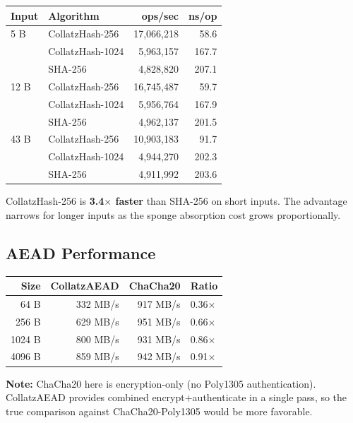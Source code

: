 \documentclass[11pt,a4paper]{article}
\newcommand{\toprule}{\hline}
\newcommand{\midrule}{\hline}
\newcommand{\bottomrule}{\hline}
\begin{document}
\begin{center}
\begin{tabular}{|l|l|r|r|}
\toprule
\textbf{Input} & \textbf{Algorithm} & \textbf{ops/sec} & \textbf{ns/op} \\
\midrule
5 B  & CollatzHash-256  & 17,066,218 & 58.6 \\
     & CollatzHash-1024 & 5,963,157  & 167.7 \\
     & SHA-256          & 4,828,820  & 207.1 \\
\midrule
12 B & CollatzHash-256  & 16,745,487 & 59.7 \\
     & CollatzHash-1024 & 5,956,764  & 167.9 \\
     & SHA-256          & 4,962,137  & 201.5 \\
\midrule
43 B & CollatzHash-256  & 10,903,183 & 91.7 \\
     & CollatzHash-1024 & 4,944,270  & 202.3 \\
     & SHA-256          & 4,911,992  & 203.6 \\
\bottomrule
\end{tabular}
\end{center}

CollatzHash-256 is \textbf{3.4$\times$ faster} than SHA-256 on short
inputs. The advantage narrows for longer inputs as the sponge
absorption cost grows proportionally.

\subsection{AEAD Performance}

\begin{center}
\begin{tabular}{|r|r|r|l|}
\toprule
\textbf{Size} & \textbf{CollatzAEAD} & \textbf{ChaCha20} & \textbf{Ratio} \\
\midrule
64 B   & 332 MB/s   & 917 MB/s  & 0.36$\times$ \\
256 B  & 629 MB/s   & 951 MB/s  & 0.66$\times$ \\
1024 B & 800 MB/s   & 931 MB/s  & 0.86$\times$ \\
4096 B & 859 MB/s   & 942 MB/s  & 0.91$\times$ \\
\bottomrule
\end{tabular}
\end{center}

\textbf{Note:} ChaCha20 here is encryption-only (no Poly1305
authentication). CollatzAEAD provides combined encrypt+authenticate in a
single pass, so the true comparison against ChaCha20-Poly1305 would be
more favorable.
\end{document}
